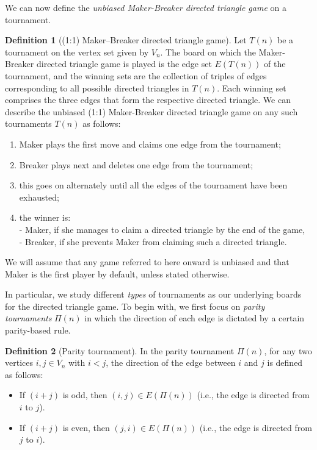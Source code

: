 \documentclass{article}
\theoremstyle{definition}
\newtheorem{defi}{Definition}[section]
\theoremstyle{plain}
\theoremstyle{remark}
\theoremstyle{definition}
\begin{document}
We can now define the \emph{unbiased Maker-Breaker directed triangle game} on a tournament.

\begin{defi}[(1:1) Maker–Breaker directed triangle game]\label{defi: MB directed triangle game}
Let $T(n)$ be a tournament on the vertex set given by $V_n$. The board on which the Maker-Breaker directed triangle game is played is the edge set $E(T(n))$ of the tournament, and the winning sets are the collection of triples of edges corresponding to all possible directed triangles in $T(n)$. Each winning set comprises the three edges that form the respective directed triangle. We can describe the unbiased (1:1) Maker-Breaker directed triangle game on any such tournaments $T(n)$ as follows:
\begin{enumerate}
    \setlength{\itemsep}{0pt}
    \item Maker plays the first move and claims one edge from the tournament;
    \item Breaker plays next and deletes one edge from the tournament;
    \item this goes on alternately until all the edges of the tournament have been exhausted;
    \item the winner is:\\- Maker, if she manages to claim a directed triangle by the end of the game, \\- Breaker, if she prevents Maker from claiming such a directed triangle.
\end{enumerate}
\end{defi}
We will assume that any game referred to here onward is unbiased and that Maker is the first player by default, unless stated otherwise.

In particular, we study different \emph{types} of tournaments as our underlying boards for the directed triangle game.
To begin with, we first focus on \emph{parity tournaments} $\Pi(n)$ in which the direction of each edge is dictated by a certain parity-based rule. 

\begin{defi}[Parity tournament]\label{defi:Parity rule}
    In the parity tournament $\Pi(n)$, for any two vertices $i, j \in V_n$ with $i < j$, the direction of the edge between $i$ and $j$ is defined as follows:
    \begin{itemize}
        \item If $(i+j)$ is odd, then $(i,j) \in E(\Pi(n))$ (i.e., the edge is directed from $i$ to $j$).
        \item If $(i+j)$ is even, then $(j,i) \in E(\Pi(n))$ (i.e., the edge is directed from $j$ to $i$).
    \end{itemize}
\end{defi}
\end{document}
